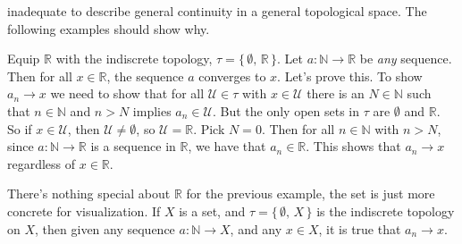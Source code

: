 \documentclass{article}
\theoremstyle{plain}
\theoremstyle{normal}
\newenvironment{example}{%
    \pushQED{\qed}\renewcommand{\qedsymbol}{$\blacksquare$}\examplex%
}{%
    \popQED\endexamplex%
}
\begin{document}
        inadequate to describe general continuity in a general topological
        space. The following examples should show why.
        \begin{example}
            Equip $\mathbb{R}$ with the indiscrete topology,
            $\tau=\{\,\emptyset,\,\mathbb{R}\,\}$. Let
            $a:\mathbb{N}\rightarrow\mathbb{R}$ be \textit{any} sequence.
            Then for all $x\in\mathbb{R}$, the sequence $a$ converges to
            $x$. Let's prove this. To show $a_{n}\rightarrow{x}$ we need to
            show that for all $\mathcal{U}\in\tau$ with $x\in\mathcal{U}$ there
            is an $N\in\mathbb{N}$ such that $n\in\mathbb{N}$ and $n>N$ implies
            $a_{n}\in\mathcal{U}$. But the only open sets in $\tau$ are
            $\emptyset$ and $\mathbb{R}$. So if $x\in\mathcal{U}$, then
            $\mathcal{U}\ne\emptyset$, so $\mathcal{U}=\mathbb{R}$. Pick
            $N=0$. Then for all $n\in\mathbb{N}$ with $n>N$, since
            $a:\mathbb{N}\rightarrow\mathbb{R}$ is a sequence in $\mathbb{R}$,
            we have that $a_{n}\in\mathbb{R}$. This shows that
            $a_{n}\rightarrow{x}$ regardless of $x\in\mathbb{R}$.
        \end{example}
        \begin{example}
            There's nothing special about $\mathbb{R}$ for the previous example,
            the set is just more concrete for visualization. If $X$ is a set,
            and $\tau=\{\,\emptyset,\,X\,\}$ is the indiscrete topology on $X$,
            then given any sequence $a:\mathbb{N}\rightarrow{X}$, and any
            $x\in{X}$, it is true that $a_{n}\rightarrow{x}$.
        \end{example}
\end{document}
